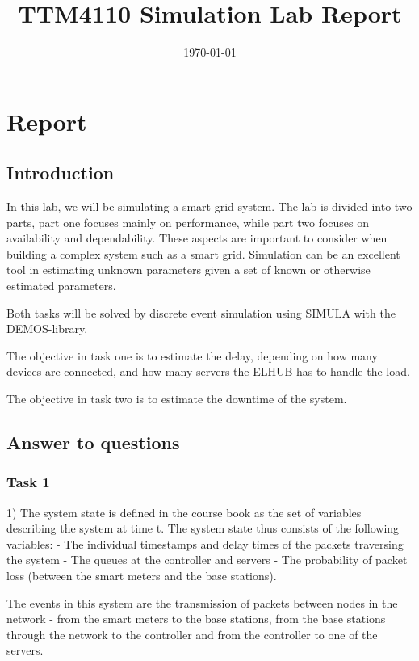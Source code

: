 \documentclass[11pt]{article}
\title{TTM4110 Simulation Lab Report}
\date{{\today}}
\begin{document}
\pagestyle{plain}

\maketitle

\section{Report}

\subsection{Introduction}

In this lab, we will be simulating a smart grid system. The lab is divided into two parts, part one focuses mainly on performance, while part two focuses on availability and dependability. These aspects are important to consider when building a complex system such as a smart grid. Simulation can be an excellent tool in estimating unknown parameters given a set of known or otherwise estimated parameters.

Both tasks will be solved by discrete event simulation using SIMULA with the DEMOS-library.

The objective in task one is to estimate the delay, depending on how many devices are connected, and how many servers the ELHUB has to handle the load.

The objective in task two is to estimate the downtime of the system.


\newpage
\subsection{Answer to questions}

\subsubsection{Task 1}

1) The system state is defined in the course book as the set of variables describing the system at time t. The system state thus consists of the following variables:
- The individual timestamps and delay times of the packets traversing the system
- The queues at the controller and servers
- The probability of packet loss (between the smart meters and the base stations).

The events in this system are the transmission of packets between nodes in the network - from the smart meters to the base stations, from the base stations through the network to the controller and from the controller to one of the servers.\\
\end{document}
